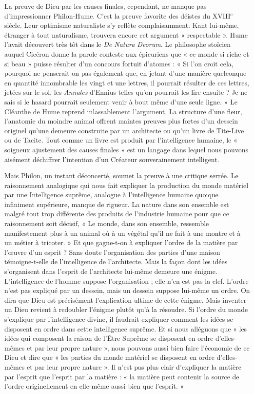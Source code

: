 La preuve de Dieu par les causes finales, cependant, ne
manque pas d’impressionner Philon-Hume. C’est la preuve
favorite des déistes du {\footnotesize XVIII}$^\text{e}$ siècle. Leur optimisme
naturaliste s’y reflète complaisamment. Kant lui-même,
étranger à tout naturalisme, trouvera encore cet argument
« respectable ». Hume l’avait découvert très tôt dans le
{\it De Natura Deorum}. Le philosophe stoïcien auquel Cicéron
donne la parole conteste aux épicuriens que « ce monde
si riche et si beau » puisse résulter d’un concours fortuit
d’atomes : « Si l’on croit cela, pourquoi ne penserait-on
pas également que, en jetant d’une manière quelconque
en quantité innombrable les vingt et une lettres, il pourrait
résulter de ces lettres, jetées sur le sol, les {\it Annales}
d’Ennius telles qu’on pourrait les lire ensuite ? Je ne sais
si le hasard pourrait seulement venir à bout même d’une
seule ligne. » Le Cléanthe de Hume reprend inlassablement
l’argument. La structure d’une fleur, l’anatomie du
moindre animal offrent maintes preuves plus fortes d’un
dessein originel qu’une demeure construite par un architecte ou qu’un livre de Tite-Live ou de Tacite. Tout
comme un livre est produit par l'intelligence humaine,
le « soigneux ajustement des causes finales » est un langage
dans lequel nous pouvons aisément déchiffrer l'intention
d’un Créateur souverainement intelligent.

Mais Philon, un instant déconcerté, soumet la preuve à
une critique serrée. Le raisonnement analogique qui nous
fait expliquer la production du monde matériel par une
Intelligence suprême, analogue à l'intelligence humaine
quoique infiniment supérieure, manque de rigueur. La
nature dans son ensemble est malgré tout trop différente
des produits de l’industrie humaine pour que ce raisonnement
soit décisif, « Le monde, dans son ensemble,
ressemble manifestement plus à un animal où à un végétal
qu’il ne fait à une montre et à un métier à tricoter. » Et
que gagne-t-on à expliquer l’ordre de la matière par
l'œuvre d’un esprit ? Sans doute l'organisation des parties
d’une maison témoigne-t-elle de l'intelligence de l’architecte.
Mais la façon dont les idées s’organisent dans l’esprit
de l’architecte lui-même demeure une énigme. L’intelligence de
l’homme suppose l’organisation ; elle n’en est
pas la clef. L’ordre n’est pas expliqué par un dessein,
mais un dessein suppose lui-même un ordre. On dira que
Dieu est précisément l'explication ultime de cette énigme.
Mais inventer un Dieu revient à redoubler l’énigme plutôt
qu’à la résoudre. Si l’ordre du monde s’explique par
l’intelligence divine, il faudrait expliquer comment les idées
se disposent en ordre dans cette intelligence suprême.
Et si nous alléguons que « les idées qui composent la raison
de l’Être Suprême se disposent en ordre d’elles-mêmes et
par leur propre nature », nous pouvons aussi bien faire
l’économie de ce Dieu et dire que « les parties du monde
matériel se disposent en ordre d’elles-mêmes et par leur
propre nature ». Il n’est pas plus clair d'expliquer la
matière par l'esprit que l’esprit par la matière :  « la
matière peut contenir la source de l’ordre originellement
en elle-même aussi bien que l'esprit. » 

